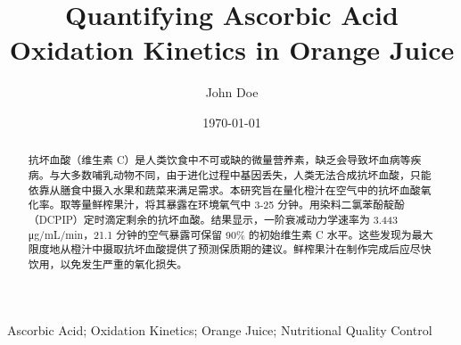 \documentclass[]{report}
\title{Quantifying Ascorbic Acid Oxidation Kinetics in Orange Juice}
\author{John Doe}
\date{\today}
\begin{document}
\maketitle

\begin{abstract}
抗坏血酸（维生素 C）是人类饮食中不可或缺的微量营养素，缺乏会导致坏血病等疾病。与大多数哺乳动物不同，由于进化过程中基因丢失，人类无法合成抗坏血酸，只能依靠从膳食中摄入水果和蔬菜来满足需求。本研究旨在量化橙汁在空气中的抗坏血酸氧化率。取等量鲜榨果汁，将其暴露在环境氧气中 3-25 分钟。用染料二氯苯酚靛酚（DCPIP）定时滴定剩余的抗坏血酸。结果显示，一阶衰减动力学速率为 3.443 μg/mL/min，21.1 分钟的空气暴露可保留 90\% 的初始维生素 C 水平。这些发现为最大限度地从橙汁中摄取抗坏血酸提供了预测保质期的建议。鲜榨果汁在制作完成后应尽快饮用，以免发生严重的氧化损失。
\end{abstract}

\begin{keywords}
Ascorbic Acid; Oxidation Kinetics; Orange Juice; Nutritional Quality Control
\end{keywords}
\end{document}

